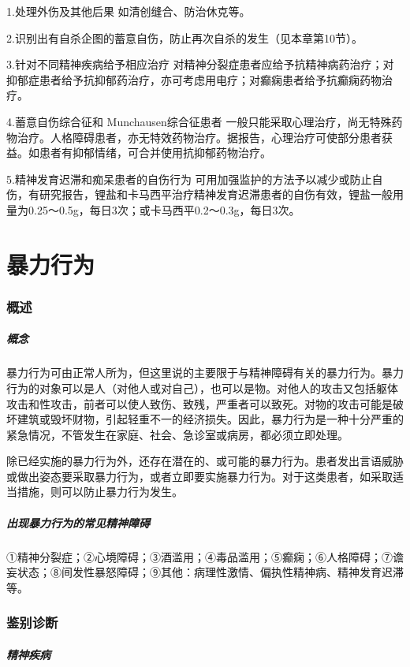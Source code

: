 1.处理外伤及其他后果 如清创缝合、防治休克等。

2.识别出有自杀企图的蓄意自伤，防止再次自杀的发生（见本章第10节）。

3.针对不同精神疾病给予相应治疗
对精神分裂症患者应给予抗精神病药治疗；对抑郁症患者给予抗抑郁药治疗，亦可考虑用电疗；对癫痫患者给予抗癫痫药物治疗。

4.蓄意自伤综合征和 Munchausen综合征患者
一般只能采取心理治疗，尚无特殊药物治疗。人格障碍患者，亦无特效药物治疗。据报告，心理治疗可使部分患者获益。如患者有抑郁情绪，可合并使用抗抑郁药物治疗。

5.精神发育迟滞和痴呆患者的自伤行为
可用加强监护的方法予以减少或防止自伤，有研究报告，锂盐和卡马西平治疗精神发育迟滞患者的自伤有效，锂盐一般用量为0.25～0.5g，每日3次；或卡马西平0.2～0.3g，每日3次。

\protect\hypertarget{text00054.html}{}{}

\section{暴力行为}

\subsubsection{概述}

\subparagraph{概念}

暴力行为可由正常人所为，但这里说的主要限于与精神障碍有关的暴力行为。暴力行为的对象可以是人（对他人或对自己），也可以是物。对他人的攻击又包括躯体攻击和性攻击，前者可以使人致伤、致残，严重者可以致死。对物的攻击可能是破坏建筑或毁坏财物，引起轻重不一的经济损失。因此，暴力行为是一种十分严重的紧急情况，不管发生在家庭、社会、急诊室或病房，都必须立即处理。

除已经实施的暴力行为外，还存在潜在的、或可能的暴力行为。患者发出言语威胁或做出姿态要采取暴力行为，或者立即要实施暴力行为。对于这类患者，如采取适当措施，则可以防止暴力行为发生。

\subparagraph{出现暴力行为的常见精神障碍}

①精神分裂症；②心境障碍；③酒滥用；④毒品滥用；⑤癫痫；⑥人格障碍；⑦谵妄状态；⑧间发性暴怒障碍；⑨其他：病理性激情、偏执性精神病、精神发育迟滞等。

\subsubsection{鉴别诊断}

\subparagraph{精神疾病}

